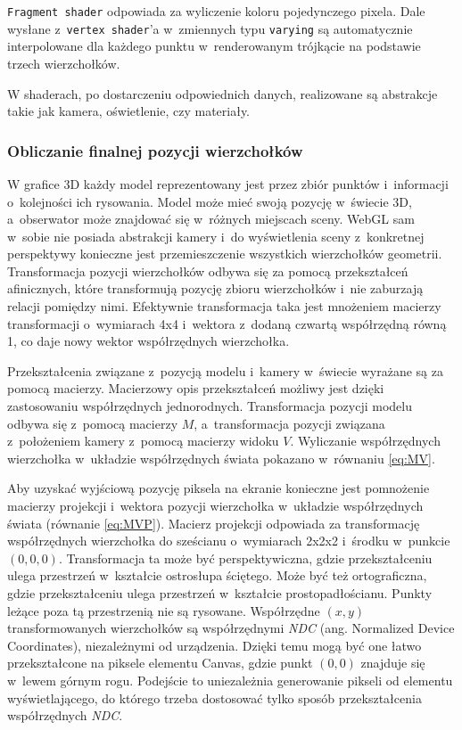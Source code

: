 \texttt{Fragment shader} odpowiada za wyliczenie koloru pojedynczego pixela. Dale wysłane z~\texttt{vertex shader}'a w~zmiennych typu \texttt{varying} są automatycznie interpolowane dla każdego punktu w~renderowanym trójkącie na podstawie trzech wierzchołków.

W shaderach, po dostarczeniu odpowiednich danych, realizowane są abstrakcje takie jak kamera, oświetlenie, czy materiały.

\subsubsection{Obliczanie finalnej pozycji wierzchołków}

W grafice 3D każdy model reprezentowany jest przez zbiór punktów i~informacji o~kolejności ich rysowania. Model może mieć swoją pozycję w~świecie 3D, a~obserwator może znajdować się w~różnych miejscach sceny. WebGL sam w~sobie nie posiada abstrakcji kamery i~do wyświetlenia sceny z~konkretnej perspektywy konieczne jest przemieszczenie wszystkich wierzchołków geometrii. Transformacja pozycji wierzchołków odbywa się za pomocą przekształceń afinicznych, które transformują pozycję zbioru wierzchołków i~nie zaburzają relacji pomiędzy nimi. Efektywnie transformacja taka jest mnożeniem macierzy transformacji o~wymiarach 4x4 i~wektora z~dodaną czwartą współrzędną równą 1, co daje nowy wektor współrzędnych wierzchołka.

Przekształcenia związane z~pozycją modelu i~kamery w~świecie wyrażane są za pomocą macierzy. Macierzowy opis przekształceń możliwy jest dzięki zastosowaniu współrzędnych jednorodnych\cite{Homogeneous}. Transformacja pozycji modelu odbywa się z~pomocą macierzy $M$, a~transformacja pozycji związana z~położeniem kamery z~pomocą macierzy widoku $V$. Wyliczanie współrzędnych wierzchołka w~układzie współrzędnych świata pokazano w~równaniu \ref{eq:MV}.

Aby uzyskać wyjściową pozycję piksela na ekranie konieczne jest pomnożenie macierzy projekcji i~wektora pozycji wierzchołka w~układzie współrzędnych świata (równanie \ref{eq:MVP}). Macierz projekcji odpowiada za transformację współrzędnych wierzchołka do sześcianu o~wymiarach 2x2x2 i~środku w~punkcie $(0, 0, 0)$. Transformacja ta może być perspektywiczna, gdzie przekształceniu ulega przestrzeń w~kształcie ostrosłupa ściętego. Może być też ortograficzna, gdzie przekształceniu ulega przestrzeń w~kształcie prostopadłościanu. Punkty leżące poza tą przestrzenią nie są rysowane. Współrzędne $(x, y)$ transformowanych wierzchołków są współrzędnymi \textit{NDC} (ang. Normalized Device Coordinates), niezależnymi od urządzenia. Dzięki temu mogą być one łatwo przekształcone na piksele elementu Canvas, gdzie punkt $(0, 0)$ znajduje się w~lewem górnym rogu. Podejście to uniezależnia generowanie pikseli od elementu wyświetlającego, do którego trzeba dostosować tylko sposób przekształcenia współrzędnych \textit{NDC}.

